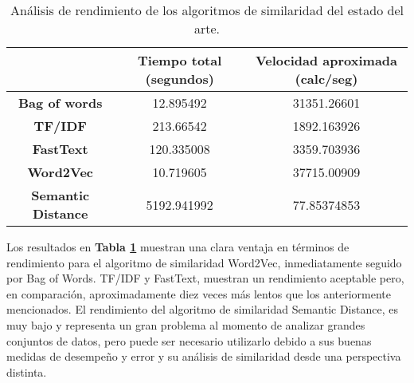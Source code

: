 \begin{table}[]
	\centering
	\begin{tabular}{|c|c|c|}
		\hline
		& \textbf{Tiempo total (segundos)} & \textbf{Velocidad aproximada (calc/seg)} \\ \hline
		\textbf{Bag of words} & 12.895492 & 31351.26601 \\ \hline
		\textbf{TF/IDF} & 213.66542 & 1892.163926 \\ \hline
		\textbf{FastText} & 120.335008  & 3359.703936 \\ \hline
		\textbf{Word2Vec}  & 10.719605 & 37715.00909 \\ \hline
		\textbf{Semantic Distance} & 5192.941992 & 77.85374853 \\ \hline
	\end{tabular}
	\caption{Análisis de rendimiento de los algoritmos de similaridad del estado del arte.}
	\label{tab:performance-estado-del-arte}
\end{table}

Los resultados en \textbf{Tabla \ref{tab:performance-estado-del-arte}}  muestran una clara ventaja en términos de rendimiento para el algoritmo de similaridad Word2Vec, inmediatamente seguido por Bag of Words. TF/IDF y FastText, muestran un rendimiento aceptable pero, en comparación, aproximadamente diez veces más lentos que los anteriormente mencionados. El rendimiento del algoritmo de similaridad Semantic Distance, es muy bajo y representa un gran problema al momento de analizar grandes conjuntos de datos, pero puede ser necesario utilizarlo debido a sus buenas medidas de desempeño y error y su análisis de similaridad desde una perspectiva distinta.

